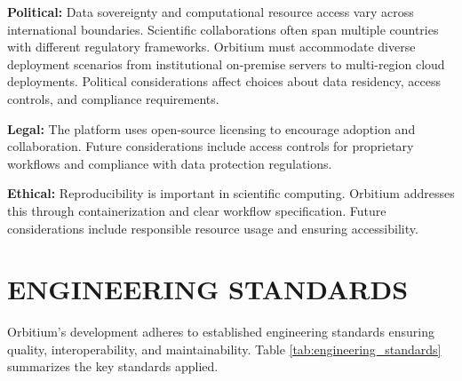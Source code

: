 \documentclass[12pt]{article}
\begin{document}
\hspace{\parindent}\textbf{Political:} Data sovereignty and computational resource access vary across international boundaries. Scientific collaborations often span multiple countries with different regulatory frameworks. Orbitium must accommodate diverse deployment scenarios from institutional on-premise servers to multi-region cloud deployments. Political considerations affect choices about data residency, access controls, and compliance requirements.

\hspace{\parindent}\textbf{Legal:} The platform uses open-source licensing to encourage adoption and collaboration. Future considerations include access controls for proprietary workflows and compliance with data protection regulations.

\hspace{\parindent}\textbf{Ethical:} Reproducibility is important in scientific computing. Orbitium addresses this through containerization and clear workflow specification. Future considerations include responsible resource usage and ensuring accessibility.

\newpage
\section{ENGINEERING STANDARDS}

\hspace{\parindent}Orbitium's development adheres to established engineering standards ensuring quality, interoperability, and maintainability. Table \ref{tab:engineering_standards} summarizes the key standards applied.
\end{document}
